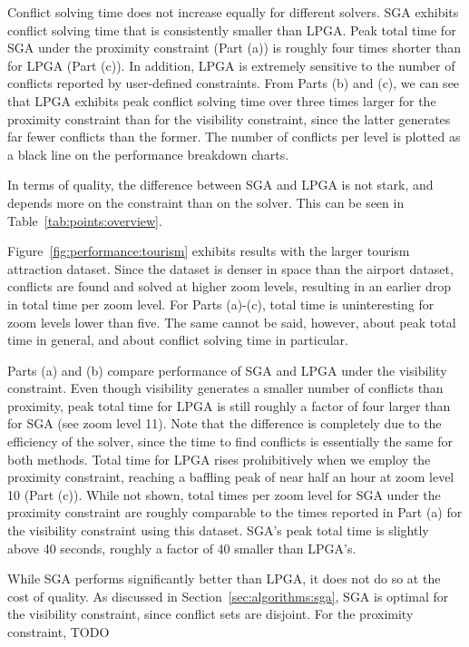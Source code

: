 Conflict solving time does not increase equally for different solvers. SGA exhibits conflict solving time that is consistently smaller than LPGA. Peak total time for SGA under the proximity constraint (Part (a)) is roughly four times shorter than for LPGA (Part (c)). In addition, LPGA is extremely sensitive to the number of conflicts reported by user-defined constraints. From Parts (b) and (c), we can see that LPGA exhibits peak conflict solving time over three times larger for the proximity constraint than for the visibility constraint, since the latter generates far fewer conflicts than the former. The number of conflicts per level is plotted as a black line on the performance breakdown charts.

In terms of quality, the difference between SGA and LPGA is not stark, and depends more on the constraint than on the solver. This can be seen in Table~\ref{tab:points:overview}.

Figure~\ref{fig:performance:tourism} exhibits results with the larger tourism attraction dataset. Since the dataset is denser in space than the airport dataset, conflicts are found and solved at higher zoom levels, resulting in an earlier drop in total time per zoom level. For Parts (a)-(c), total time is uninteresting for zoom levels lower than five. The same cannot be said, however, about peak total time in general, and about conflict solving time in particular.

Parts (a) and (b) compare performance of SGA and LPGA under the visibility constraint. Even though visibility generates a smaller number of conflicts than proximity, peak total time for LPGA is still roughly a factor of four larger than for SGA (see zoom level 11). Note that the difference is completely due to the efficiency of the solver, since the time to find conflicts is essentially the same for both methods. Total time for LPGA rises prohibitively when we employ the proximity constraint, reaching a baffling peak of near half an hour at zoom level 10 (Part (c)). While not shown, total times per zoom level for SGA under the proximity constraint are roughly comparable to the times reported in Part (a) for the visibility constraint using this dataset. SGA's peak total time is slightly above 40 seconds, roughly a factor of 40 smaller than LPGA's.         

While SGA performs significantly better than LPGA, it does not do so at the cost of quality. As discussed in Section~\ref{sec:algorithms:sga}, SGA is optimal for the visibility constraint, since conflict sets are disjoint. For the proximity constraint, TODO

